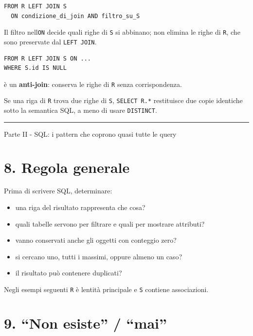 \documentclass[
  10pt,
  a4paper,
]{article}
\providecommand{\tightlist}{%
  \setlength{\itemsep}{0pt}\setlength{\parskip}{0pt}}
\begin{document}
\begin{verbatim}
FROM R LEFT JOIN S
  ON condizione_di_join AND filtro_su_S
\end{verbatim}

Il filtro nell\textquotesingle{}\texttt{ON} decide quali righe di
\texttt{S} si abbinano; non elimina le righe di \texttt{R}, che sono
preservate dal \texttt{LEFT\ JOIN}.

\begin{verbatim}
FROM R LEFT JOIN S ON ...
WHERE S.id IS NULL
\end{verbatim}

è un \textbf{anti-join}: conserva le righe di \texttt{R} senza
corrispondenza.

Se una riga di \texttt{R} trova due righe di \texttt{S},
\texttt{SELECT\ R.*} restituisce due copie identiche sotto la semantica
SQL, a meno di usare \texttt{DISTINCT}.

\begin{center}\rule{0.5\linewidth}{0.5pt}\end{center}

Parte II - SQL: i pattern che coprono quasi tutte le query

\section{8. Regola generale}\label{8-regola-generale}

Prima di scrivere SQL, determinare:

\begin{itemize}
\tightlist
\item
  una riga del risultato rappresenta che cosa?
\item
  quali tabelle servono per filtrare e quali per mostrare attributi?
\item
  vanno conservati anche gli oggetti con conteggio zero?
\item
  si cercano uno, tutti i massimi, oppure almeno un caso?
\item
  il risultato può contenere duplicati?
\end{itemize}

Negli esempi seguenti \texttt{R} è l\textquotesingle entità principale e
\texttt{S} contiene associazioni.

\section{9. ``Non esiste'' / ``mai''}\label{9-non-esiste--mai}
\end{document}
